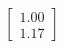 \documentclass[preview]{standalone}
\begin{document}
\begin{align*}
\begin{bmatrix} 1.00 \\ 1.17 \end{bmatrix}
\end{align*}
\end{document}
